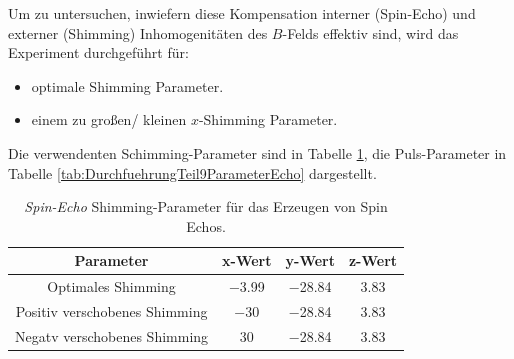 \documentclass[../main.tex]{subfiles}
\begin{document}
        Um zu untersuchen, inwiefern diese Kompensation interner (Spin-Echo) und externer (Shimming) Inhomogenitäten des $B$-Felds effektiv sind, wird das Experiment durchgeführt für:
        \begin{itemize}
            \item optimale Shimming Parameter.
            \item einem zu großen/ kleinen $x$-Shimming Parameter.
        \end{itemize}

        Die verwendenten Schimming-Parameter sind in Tabelle \ref{tab:DurchfuehrungTeil9ParameterShimming}, die Puls-Parameter in Tabelle \ref{tab:DurchfuehrungTeil9ParameterEcho} dargestellt.
    
        \begin{table}[H]
            \centering
            \begin{tabular}{c|ccc}
                \textbf{Parameter} & \textbf{x-Wert} & \textbf{y-Wert} & \textbf{z-Wert}  \\\hline\hline
                Optimales Shimming & \num{-3.99} & \num{-28.84} & \num{3.83}\\
                Positiv verschobenes Shimming & \num{-30} & \num{-28.84} & \num{3.83}\\
                Negatv verschobenes Shimming & \num{30} & \num{-28.84} & \num{3.83}
            \end{tabular}
            \caption{\textit{Spin-Echo} Shimming-Parameter für das Erzeugen von Spin Echos.}
            \label{tab:DurchfuehrungTeil9ParameterShimming}
        \end{table}
\end{document}
